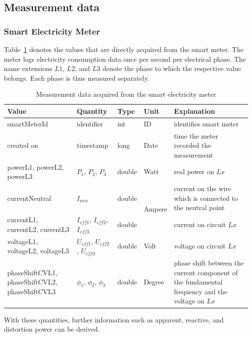 \subsection{Measurement data}
\subsubsection{Smart Electricity Meter}
Table~\ref{meter_values} denotes the values that are directly acquired from the smart meter. The meter logs electricity consumption data once per second per electrical phase. The name extensions $L1$, $L2$, and $L3$ denote the phase to which the respective value belongs. 
Each phase is thus measured separately. 

\begin{table}[htdp]
\caption{Measurement data acquired from the smart electricity meter\cite{recognize_home_appliances}}
\begin{center}
\begin{tabular}{|p{3cm}|l|l|l|p{4cm}|}
\hline
Value & Quantity & Type & Unit & Explanation \\
\hline
\hline
smartMeterId & identifier & int & ID & identifies smart meter\\
\hline
created on & timestamp & long & Date & time the meter recorded the measurement\\
\hline 
powerL1, powerL2, powerL3 & $P_1$, $P_2$, $P_3$ & double & Watt & real power on $Lx$\\
\hline
currentNeutral & $I_{neu}$ & double & \multirow{2}{*}{Ampere} & current on the wire which is connected to the neutral point \\
\cline{1-3}\cline{5-5}   
currentL1, currentL2, currentL3 & $I_{eff1}$, $I_{eff2}$, $I_{eff3}$ & double & & current on circuit $Lx$\\
\hline
voltageL1, voltageL2, voltageL3 & $U_{eff1}$, $U_{eff2}$, $U_{eff3}$ & double & Volt & voltage on circuit $Lx$\\ 
\hline
phaseShiftCVL1, phaseShiftCVL2, phaseShiftCVL3 & $\phi_1$, $\phi_2$, $\phi_3$ & double & Degree & phase shift between the current component of the fundamental frequency and the voltage on $Lx$\\
\hline      
\end{tabular}
\end{center}
\label{meter_values}
\end{table}%

With these quantities, further information such as apparent, reactive, and distortion power can be derived. 


